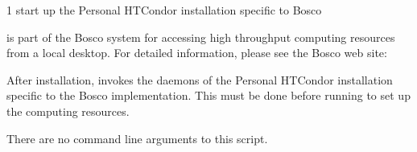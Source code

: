 \begin{ManPage}{\label{man-bosco-start}}{1}
{start up the Personal HTCondor installation specific to Bosco}


\Synopsis {}

\Description

 is part of the Bosco system for accessing high
throughput computing resources from a local desktop.
For detailed information, please see the Bosco web site:

After installation,  invokes the daemons of the
Personal HTCondor installation specific to the Bosco implementation.
This must be done before running  to set up the
computing resources.

There are no command line arguments to this script.


\end{ManPage}
